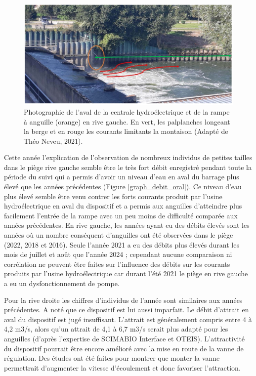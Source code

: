 \documentclass[11pt,titlepage,twoside]{article}\usepackage[]{graphicx}\usepackage[table]{xcolor}
\begin{document}
\begin{figure}[htpb]
\centering
\includegraphics[width=\textwidth]{Discu.png}
\caption{Photographie de l’aval de la centrale hydroélectrique et de la rampe à anguille (orange) en rive gauche. En vert, les palplanches longeant la berge et en rouge les courants limitants la montaison (Adapté de Théo Neveu, 2021).}
\label{Discu}
\end{figure} 

\vspace{0.5cm}
Cette année l’explication de l’observation de nombreux individus de petites tailles dans le piège rive gauche semble être le très fort débit enregistré pendant toute la période du suivi qui a permis d’avoir un niveau d’eau en aval du barrage plus élevé que les années précédentes (Figure \ref{graph_debit_oral}). Ce niveau d’eau plus élevé semble être venu contrer les forts courants produit par l’usine hydroélectrique en aval du dispositif et a permis aux anguilles d’atteindre plus facilement l’entrée de la rampe avec un peu moins de difficulté comparée aux années précédentes. En rive gauche, les années ayant eu des débits élevés sont les années où un nombre conséquent d’anguilles ont été observées dans le piège (2022, 2018 et 2016). Seule l’année 2021 a eu des débits plus élevés durant les mois de juillet et août que l’année 2024 ; cependant aucune comparaison ni corrélation ne peuvent être faites sur l’influence des débits sur les courants produits par l’usine hydroélectrique car durant l’été 2021 le piège en rive gauche a eu un dysfonctionnement de pompe.

\vspace{0.5cm}
Pour la rive droite les chiffres d’individus de l’année sont similaires aux années précédentes. A noté que ce dispositif est lui aussi imparfait. Le débit d’attrait en aval du dispositif est jugé insuffisant.  L’attrait est généralement compris entre 4 à 4,2 m3/s, alors qu’un attrait de 4,1 à 6,7 m3/s serait plus adapté pour les anguilles (d’après l’expertise de SCIMABIO Interface et OTEIS). L’attractivité du dispositif pourrait être encore amélioré avec la mise en route de la vanne de régulation. Des études ont été faites pour montrer que monter la vanne permettrait d’augmenter la vitesse d’écoulement et donc favoriser l’attraction.
\end{document}
